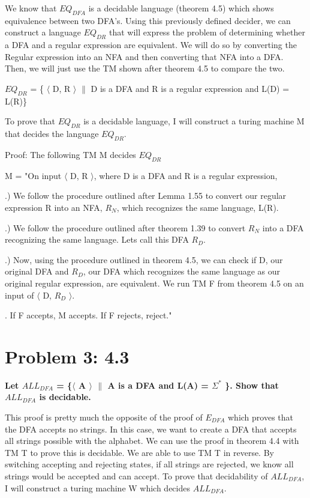 \documentclass[12pt]{article}
\begin{document}
We know that $EQ_{DFA}$ is a decidable language (theorem 4.5) which shows equivalence between two DFA's. Using this previously defined decider, we can construct a language $EQ_{DR}$ that will express the problem of determining whether a DFA and a regular expression are equivalent. We will do so by converting the Regular expression into an NFA and then converting that NFA into a DFA. Then, we will just use the TM shown after theorem 4.5 to compare the two.

 $EQ_{DR}$ = \{ $\langle$ D, R $\rangle$ $\|$ D is a DFA and R is a regular expression and L(D) = L(R)\}
 
 To prove that $EQ_{DR}$ is a decidable language, I will construct a turing machine M that decides the language $EQ_{DR}$.
 
 Proof: The following TM M decides $EQ_{DR}$
 
 M = "On input $\langle$ D, R $\rangle$, where D is a DFA and R is a regular expression,
 \setlength{\parindent}{5ex}
 
 .) We follow the procedure outlined after Lemma 1.55 to convert our regular expression \indent R into an NFA, $R_N$, which recognizes the same language, L(R). 
 
  .) We follow the procedure outlined after theorem 1.39 to convert $R_N$ into a DFA \indent recognizing the same language. Lets call this DFA $R_D$.
 
  .) Now, using the procedure outlined in theorem 4.5, we can check if D, our original \indent DFA and $R_D$, our DFA which recognizes the same language as our original regular \indent expression, are equivalent. We run TM F from theorem 4.5 on an input of $\langle$ D, $R_D$ $\rangle$.
 
  . If F accepts, M accepts. If F rejects, reject."
 \setlength{\parindent}{0ex}

\section*{Problem 3: 4.3}
{\bfseries Let $ALL_{DFA}$ = \{$\langle$ A $\rangle$ $\|$ A is a DFA and L(A) = $\Sigma^*$ \}. Show that $ALL_{DFA}$ is decidable.}

This proof is pretty much the opposite of the proof of $E_{DFA}$ which proves that the DFA accepts no strings. In this case, we want to create a DFA that accepts all strings possible with the alphabet. We can use the proof in theorem 4.4 with TM T to prove this is decidable. We are able to use TM T in reverse. By switching accepting and rejecting states, if all strings are rejected, we know all strings would be accepted and can accept. To prove that decidability of $ALL_{DFA}$, I will construct a turing machine W which decides $ALL_{DFA}$.
\end{document}

